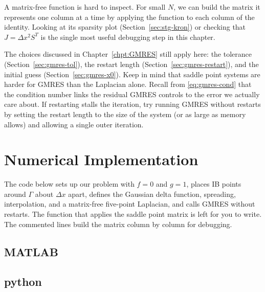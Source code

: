 \begin{remark}
A matrix-free function is hard to inspect. For small $N$, we can build the
matrix it represents one column at a time by applying the function to each
column of the identity. Looking at its sparsity plot
(Section~\ref{sec:stg-kron}) or checking that $J = \Delta x^2 S^T$ is the
single most useful debugging step in this chapter.
\end{remark}

The choices discussed in Chapter~\ref{chpt:GMRES} still apply here: the
tolerance (Section~\ref{sec:gmres-tol}), the restart length
(Section~\ref{sec:gmres-restart}), and the initial guess
(Section~\ref{sec:gmres-x0}). Keep in mind that saddle point systems are
harder for GMRES than the Laplacian alone. Recall from
\eqref{eq:gmres-cond} that the condition number links the residual GMRES
controls to the error we actually care about. If restarting stalls the
iteration, try running GMRES without restarts by setting the restart
length to the size of the system (or as large as memory allows) and
allowing a single outer iteration.

\section{Numerical Implementation}
\label{sec:IBcode}

The code below sets up our problem with $f = 0$ and $g = 1$, places IB
points around $\Gamma$ about $\Delta x$ apart, defines the Gaussian delta
function, spreading, interpolation, and a matrix-free five-point
Laplacian, and calls GMRES without restarts. The function that applies the
saddle point matrix is left for you to write. The commented lines build
the matrix column by column for debugging.


\subsection{MATLAB}


\subsection{python}

